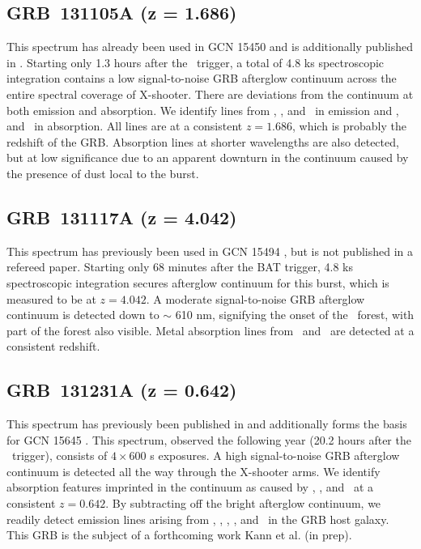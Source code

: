\documentclass[longauth]{aa}    %
\begin{document}
\subsection{GRB~131105A (z = 1.686)}\label{131105}

This spectrum has already been used in GCN 15450 \citep{GCN15450} and is
additionally published in \citet{Kruhler2015}. Starting only 1.3 hours after the
\swift~trigger, a total of 4.8 ks spectroscopic integration contains a low
signal-to-noise GRB afterglow continuum across the entire spectral coverage of
X-shooter. There are deviations from the continuum at both emission and
absorption. We identify lines from \hb, \oiii, and \ha~in emission and \feii,
and \mgii~in absorption. All lines are at a consistent $z = 1.686$, which is
probably the redshift of the GRB. Absorption lines at shorter wavelengths are
also detected, but at low significance due to an apparent downturn in the
continuum caused by the presence of dust local to the burst.

\subsection{GRB~131117A (z = 4.042)}\label{131117}

This spectrum has previously been used in GCN 15494 \citep{GCN15494}, but is not
published in a refereed paper. Starting only 68 minutes after the BAT trigger,
4.8 ks spectroscopic integration secures afterglow continuum for this burst,
which is measured to be at $z = 4.042$. A moderate signal-to-noise GRB afterglow
continuum is detected down to $\sim$ 610 nm, signifying the onset of the
\lya~forest, with part of the forest also visible. Metal absorption lines from
\SIii~and \SIiv~are detected at a consistent redshift.

\subsection{GRB~131231A (z = 0.642)}\label{131231}

This spectrum has previously been published in \citet{Kruhler2015} and
additionally forms the basis for GCN 15645 \citep{GCN15645}. This spectrum,
observed the following year (20.2 hours after the \swift~trigger), consists of
$4\times600$ s exposures. A high signal-to-noise GRB afterglow continuum is
detected all the way through the X-shooter arms. We identify absorption features
imprinted in the continuum as caused by \feii, \mgii, and \cahk~at a consistent
$z = 0.642$. By subtracting off the bright afterglow continuum, we readily
detect emission lines arising from \oii, \hg, \hb, \oiii, and \ha~in the GRB
host galaxy. This GRB is the subject of a forthcoming work Kann et al. (in
prep).
\end{document}
